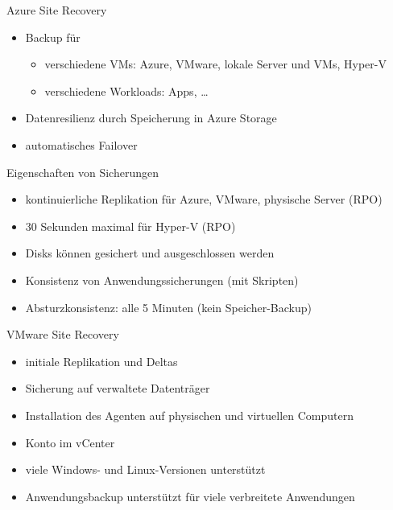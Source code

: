 \begin{flashcard}[Definition]{Azure Site Recovery}
  \begin{itemize}
    \item Backup für
      \begin{itemize}
        \item verschiedene VMs: Azure, VMware, lokale Server und VMs, Hyper-V
        \item verschiedene Workloads: Apps, \ldots
      \end{itemize}
    \item Datenresilienz durch Speicherung in Azure Storage
    \item automatisches Failover
  \end{itemize}
\end{flashcard}

\begin{flashcard}[Definition]{Eigenschaften von Sicherungen}
  \begin{itemize}
    \item kontinuierliche Replikation für Azure, VMware, physische Server (RPO)
    \item 30 Sekunden maximal für Hyper-V (RPO)
    \item Disks können gesichert und ausgeschlossen werden
    \item Konsistenz von Anwendungssicherungen (mit Skripten)
    \item Absturzkonsistenz: alle 5 Minuten (kein Speicher-Backup)
  \end{itemize}
\end{flashcard}

\begin{flashcard}[Definition]{VMware Site Recovery}
  \begin{itemize}
    \item initiale Replikation und Deltas
    \item Sicherung auf verwaltete Datenträger
    \item Installation des Agenten auf physischen und virtuellen Computern
    \item Konto im vCenter
    \item viele Windows- und Linux-Versionen unterstützt
    \item Anwendungsbackup unterstützt für viele verbreitete Anwendungen
  \end{itemize}
\end{flashcard}

